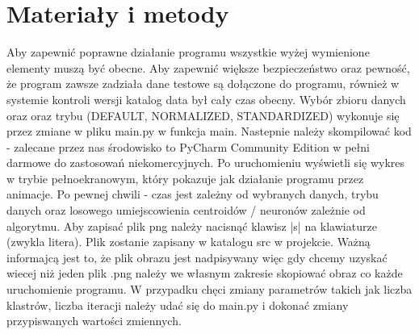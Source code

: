 \documentclass{classrep}
\begin{document}
\section{Materiały i metody}
{Aby zapewnić poprawne działanie programu wszystkie wyżej wymienione elementy muszą być obecne. Aby zapewnić większe bezpieczeństwo oraz pewność, że program zawsze zadziała dane testowe są dołączone do programu, również w systemie kontroli wersji katalog data był cały czas obecny. Wybór zbioru danych oraz oraz trybu (DEFAULT, NORMALIZED, STANDARDIZED) wykonuje się przez zmiane w pliku main.py w funkcja main. Nastepnie należy skompilować kod - zalecane przez nas środowisko to PyCharm Community Edition w pełni darmowe do zastosowań niekomercyjnych. Po uruchomieniu wyświetli się wykres w trybie pełnoekranowym, który pokazuje jak działanie programu przez animacje. Po pewnej chwili - czas jest zależny od wybranych danych, trybu danych oraz losowego umiejscowienia centroidów / neuronów zależnie od algorytmu. Aby zapisać plik png należy nacisnąć klawisz |s| na klawiaturze (zwykla litera). Plik zostanie zapisany w katalogu src w projekcie. Ważną informajcą jest to, że plik obrazu jest nadpisywany więc gdy chcemy uzyskać wiecej niż jeden plik .png należy we własnym zakresie skopiować obraz co każde uruchomienie programu. W przypadku chęci zmiany parametrów takich jak liczba klastrów, liczba iteracji należy udać się do main.py i dokonać zmiany przypiswanych wartości zmiennych.
}
\end{document}
